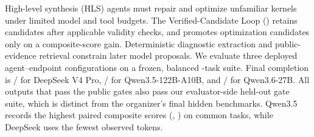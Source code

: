 High-level synthesis (HLS) agents must repair and optimize unfamiliar kernels
under limited model and tool budgets. The Verified-Candidate Loop (\VCL)
retains candidates after applicable validity checks,
and promotes optimization candidates only on a composite-score gain. Deterministic
diagnostic extraction and public-evidence retrieval constrain later model
proposals. We evaluate three deployed agent--endpoint configurations on a
frozen, balanced \CorpusTaskCount{}-task suite. Final completion is
\DeepSeekSuccessCount{}/\CorpusTaskCount{} for DeepSeek V4 Pro,
\QwenThreeFiveSuccessCount{}/\CorpusTaskCount{} for Qwen3.5-122B-A10B, and
\QwenThreeSixSuccessCount{}/\CorpusTaskCount{} for Qwen3.6-27B. All
\IndependentHiddenCorrectCount{} outputs that pass the public gates also pass
our evaluator-side held-out gate suite, which is distinct from the organizer's
final hidden benchmarks. Qwen3.5 records the highest paired composite scores
(\QwenThreeFiveCommonQorProxy{}, \QwenThreeFiveCommonReferenceQorMean{}) on
\CommonQorTaskCount{} common tasks, while DeepSeek uses the fewest observed tokens.
